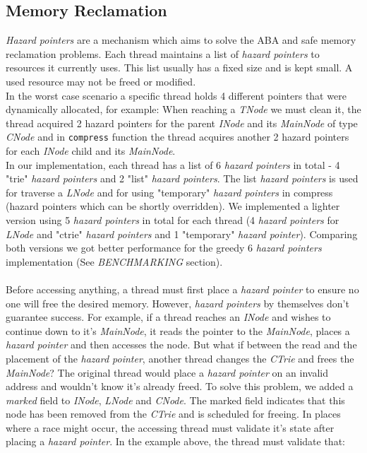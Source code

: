 \documentclass[conference]{IEEEtran}
\begin{document}
\subsection{Memory Reclamation}
	\textit{Hazard pointers} are a mechanism which aims to solve the ABA and safe memory reclamation problems\cite{hazard}\cite{wiki-hazard}. Each thread maintains a list of \textit{hazard pointers} to resources it currently uses. This list usually has a fixed size and is kept small. A used resource may not be freed or modified.\\
	In the worst case scenario a specific thread holds 4 different pointers that were dynamically allocated, for example:
	When reaching a \textit{TNode} we must clean it, the thread acquired 2 hazard pointers for the parent \textit{INode} and its \textit{MainNode} of type \textit{CNode} and in \texttt{compress} function the thread acquires another 2 hazard pointers for each \textit{INode} child and its \textit{MainNode}. \\
	In our implementation, each thread has a list of 6 \textit{hazard pointers} in total - 4 "trie" \textit{hazard pointers} and 2 "list" \textit{hazard pointers}. The list \textit{hazard pointers} is used for traverse a \textit{LNode} and for using "temporary" \textit{hazard pointers} in compress (hazard pointers which can be shortly overridden). We implemented a lighter version using 5 \textit{hazard pointers} in total\cite{5-hp-cictrie} for each thread (4 \textit{hazard pointers} for \textit{LNode} and "ctrie" \textit{hazard pointers} and 1 "temporary" \textit{hazard pointer}). Comparing both versions we got better performance for the greedy 6 \textit{hazard pointers} implementation (See \textit{BENCHMARKING} section). \\\\
	Before accessing anything, a thread must first place a \textit{hazard pointer} to ensure no one will free the desired memory. However, \textit{hazard pointers} by themselves don't guarantee success. For example, if a thread reaches an \textit{INode} and wishes to continue down to it's \textit{MainNode}, it reads the pointer to the \textit{MainNode}, places a \textit{hazard pointer} and then accesses the node. But what if between the read and the placement of the \textit{hazard pointer}, another thread changes the \textit{CTrie} and frees the \textit{MainNode}? The original thread would place a \textit{hazard pointer} on an invalid address and wouldn't know it's already freed. To solve this problem, we added a \textit{marked} field to \textit{INode}, \textit{LNode} and \textit{CNode}. The marked field indicates that this node has been removed from the \textit{CTrie} and is scheduled for freeing. In places where a race might occur, the accessing thread must validate it's state after placing a \textit{hazard pointer}. In the example above, the thread must validate that:
\end{document}
